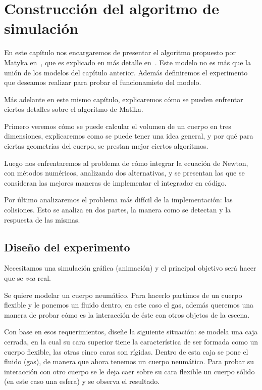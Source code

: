 \chapter{Construcción del algoritmo de simulación}

En este capítulo nos encargaremos de presentar el algoritmo propuesto por Matyka en~\cite{Matyka:Presion}, que es explicado en más detalle en~\cite{Matika:SoftBody}.
Este modelo no es más que la unión de los modelos del capítulo anterior.
Además definiremos el experimento que deseamos realizar para probar el funcionamieto del modelo.

Más adelante en este mismo capítulo, explicaremos cómo se pueden enfrentar ciertos detalles sobre el algoritmo de Matika.

Primero veremos cómo se puede calcular el volumen de un cuerpo en tres dimensiones, explicaremos como se puede tener una idea general, y por qué para ciertas geometrías del cuerpo, se prestan mejor ciertos algoritmos.

Luego nos enfrentaremos al problema de cómo integrar la ecuación de Newton, con métodos numéricos, analizando dos alternativas, y se presentan las que se consideran las mejores maneras de implementar el integrador en código.

Por último analizaremos el problema más difícil de la implementación: las colisiones.
Esto se analiza en dos partes, la manera como se detectan y la respuesta de las mismas.

\section{Diseño del experimento}
\label{descripcion:experimento}
Necesitamos una simulación gráfica (animación) y el principal objetivo será hacer que se \emph{vea} real.

Se quiere modelar un cuerpo neumático.
Para hacerlo partimos de un cuerpo flexible y le ponemos un fluido dentro, en este caso el gas, además queremos una manera de probar cómo es la interacción de éste con otros objetos de la escena. 

Con base en esos requerimientos, diseñe la siguiente situación: se modela una caja cerrada, en la cual su cara superior tiene la característica de ser formada como un cuerpo flexible, las otras cinco caras son rígidas.
Dentro de esta caja se pone el fluido (gas), de manera que ahora tenemos un cuerpo neumático.
Para probar su interacción con otro cuerpo se le deja caer sobre su cara flexible un cuerpo sólido (en este caso una esfera) y se observa el resultado.

